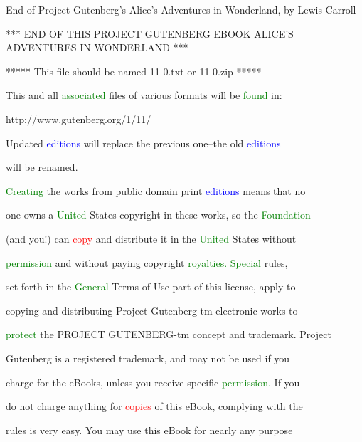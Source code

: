  End of Project Gutenberg’s Alice’s \textcolor{BurntOrange}{Adventures} in Wonderland, by Lewis Carroll



 *** END OF THIS PROJECT GUTENBERG EBOOK ALICE’S \textcolor{BurntOrange}{ADVENTURES} IN WONDERLAND ***



 ***** This file should be named 11-0.txt or 11-0.zip *****

 This and all \textcolor{green}{associated} files of various formats will be \textcolor{green}{found} in:

 http://www.gutenberg.org/1/11/







 Updated \textcolor{blue}{editions} will replace the previous one--the old \textcolor{blue}{editions}

 will be renamed.



 \textcolor{green}{Creating} the works from \textcolor{BurntOrange}{public} domain print \textcolor{blue}{editions} means that no

 one owns a \textcolor{green}{United} States copyright in these works, so the \textcolor{green}{Foundation}

 (and you!) can \textcolor{red}{copy} and distribute it in the \textcolor{green}{United} States without

 \textcolor{green}{permission} and without \textcolor{BurntOrange}{paying} copyright \textcolor{green}{royalties.} \textcolor{green}{Special} \textcolor{BurntOrange}{rules,}

 set forth in the \textcolor{green}{General} Terms of Use part of this license, apply to

 copying and distributing Project Gutenberg-tm electronic works to

 \textcolor{green}{protect} the PROJECT GUTENBERG-tm concept and trademark. Project

 Gutenberg is a registered trademark, and may not be used if you

 charge for the eBooks, unless you receive specific \textcolor{green}{permission.} If you

 do not charge anything for \textcolor{red}{copies} of this eBook, complying with the

 \textcolor{BurntOrange}{rules} is very easy. You may use this eBook for nearly any purpose

